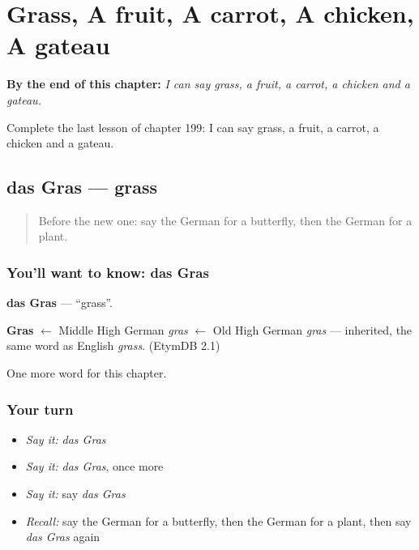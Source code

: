 
\chapter{Grass, A fruit, A carrot, A chicken, A gateau}
\label{ch:ge-grass-a-fruit-a-carrot-a-chicken-a-gateau}

\begin{chapteropening}
\textbf{By the end of this chapter:} \emph{I can say grass, a fruit, a carrot, a chicken and a gateau.}

Complete the last lesson of chapter 199: I can say grass, a fruit, a carrot, a chicken and a gateau.
\end{chapteropening}

\section[das Gras]{das Gras — grass}

\label{lesson:GE-C199-gras}



\begin{quote}
Before the new one: say the German for a butterfly, then the German for a plant.
\end{quote}

\subsection*{You'll want to know: das Gras}
\textbf{das Gras} — \textquotedblleft{}grass\textquotedblright{}.

\begin{cousinweb}
\textbf{Gras} $\leftarrow$ Middle High German \emph{gras} $\leftarrow$ Old High German \emph{gras} — inherited, the same word as English \emph{grass}. (EtymDB 2.1)
\end{cousinweb}

\begin{grammarlens}[title={What you've built}]
One more word for this chapter.
\end{grammarlens}

\subsection*{Your turn}
\begin{itemize}
\raggedright
  \item \emph{Say it:} \emph{das Gras}
  \item \emph{Say it:} \emph{das Gras}, once more
  \item \emph{Say it:} say \emph{das Gras}
  \item \emph{Recall:} say the German for a butterfly, then the German for a plant, then say \emph{das Gras} again
\end{itemize}

